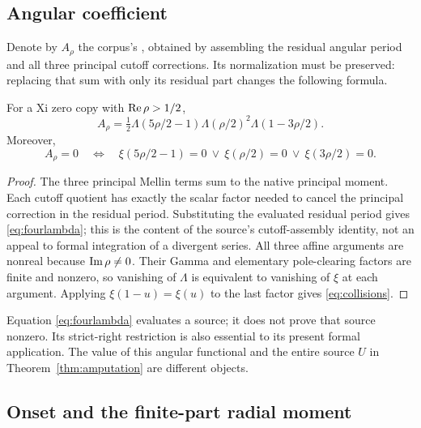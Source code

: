 \subsection{Angular coefficient}

Denote by \(A_\rho\) the corpus's , obtained by assembling the residual angular period and all three principal cutoff corrections. Its normalization must be preserved: replacing that sum with only its residual part changes the following formula.

\begin{theorem}\label{thm:angular}
For a Xi zero copy with \(\operatorname{Re}\rho>1/2\),
\begin{equation}\label{eq:fourlambda}
 A_\rho=\tfrac12\Lambda(5\rho/2-1)\Lambda(\rho/2)^2
                         \Lambda(1-3\rho/2).
\end{equation}
Moreover,
\begin{equation}\label{eq:collisions}
 A_\rho=0\quad\Longleftrightarrow\quad
 \xi(5\rho/2-1)=0\ \lor\ \xi(\rho/2)=0\ \lor\ \xi(3\rho/2)=0.
\end{equation}
\end{theorem}
\begin{proof}
The three principal Mellin terms sum to the native principal moment. Each cutoff quotient has exactly the scalar factor needed to cancel the principal correction in the residual period. Substituting the evaluated residual period gives \eqref{eq:fourlambda}; this is the content of the source's cutoff-assembly identity, not an appeal to formal integration of a divergent series. All three affine arguments are nonreal because \(\operatorname{Im}\rho\ne0\). Their Gamma and elementary pole-clearing factors are finite and nonzero, so vanishing of \(\Lambda\) is equivalent to vanishing of \(\xi\) at each argument. Applying \(\xi(1-u)=\xi(u)\) to the last factor gives \eqref{eq:collisions}.
\end{proof}

Equation \eqref{eq:fourlambda} evaluates a source; it does not prove that source nonzero. Its strict-right restriction is also essential to its present formal application. The value of this angular functional and the entire source \(U\) in Theorem~\ref{thm:amputation} are different objects.

\subsection{Onset and the finite-part radial moment}

